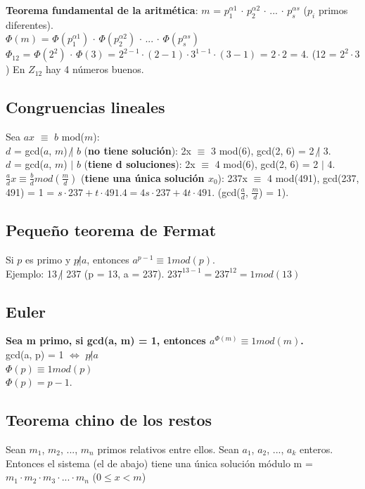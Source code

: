 \documentclass{article}
\begin{document}
\textbf{Teorema fundamental de la aritmética}:  $m$ = $p_1^{\alpha 1}$ $\cdot$ $p_2^{\alpha 2}$ $\cdot$ ... $\cdot$ $p_s^{\alpha s}$ ($p_i$ primos diferentes). \\
$\varPhi (m)$ = $\varPhi (p_1^{\alpha 1})$ $\cdot$ $\varPhi (p_2^{\alpha 2})$ $\cdot$ ... $\cdot$ $\varPhi (p_s^{\alpha s})$ \\
$\varPhi_{12}$ = $\varPhi (2^2)$ $\cdot$ $\varPhi (3)$ = $2^{2-1} \cdot (2-1) \cdot 3^{1-1} \cdot (3-1)$ = $2 \cdot 2$ = 4. (12 = $2^2 \cdot 3$) En $Z_{12}$ hay 4 números buenos. 

\subsection{Congruencias lineales}
Sea $ax$ $\equiv$ $b$ mod($m$): \\
$d$ = gcd($a$, $m$) $\not|$ $b$ (\textbf{no tiene solución}): 2x $\equiv$ 3 mod(6), gcd(2, 6) = 2 $\not|$ 3. \\
$d$ = gcd($a$, $m$) $|$ $b$ (\textbf{tiene d soluciones}): 2x $\equiv$ 4 mod(6), gcd(2, 6) = 2 $|$ 4. \\
$\frac{a}{d}x \equiv \frac{b}{d} mod(\frac{m}{d})$ (\textbf{tiene una única solución $x_0$}): 237x $\equiv$ 4 mod(491), gcd(237, 491) = 1 = $s \cdot 237 + t \cdot 491. 4 = 4s \cdot 237 + 4t \cdot 491$. (gcd($\frac{a}{d}$, $\frac{m}{d}$) = 1). 

\subsection{Pequeño teorema de Fermat}
Si $p$ es primo y $p \not| a$, entonces $a^{p-1} \equiv 1 mod(p)$. \\
Ejemplo: 13 $\not|$ 237 (p = 13, a = 237). $237^{13-1} = 237^12 = 1 mod(13)$

\subsection{Euler}
\textbf{Sea m primo, si gcd(a, m) = 1, entonces $a^{\varPhi (m)} \equiv 1 mod(m)$.} \\
gcd(a, p) = 1 $\Leftrightarrow$ $p \not| a$ \\
$\varPhi (p) \equiv 1 mod(p)$ \\
$\varPhi (p) = p - 1$.

\newpage

\subsection{Teorema chino de los restos}
Sean $m_1$, $m_2$, ..., $m_n$ primos relativos entre ellos. Sean $a_1$, $a_2$, ..., $a_k$ enteros. Entonces el sistema (el de abajo) tiene una única solución módulo m = $m_1 \cdot m_2 \cdot m_3 \cdot ... \cdot m_n$ ($0 \leq x < m$) 
\end{document}
